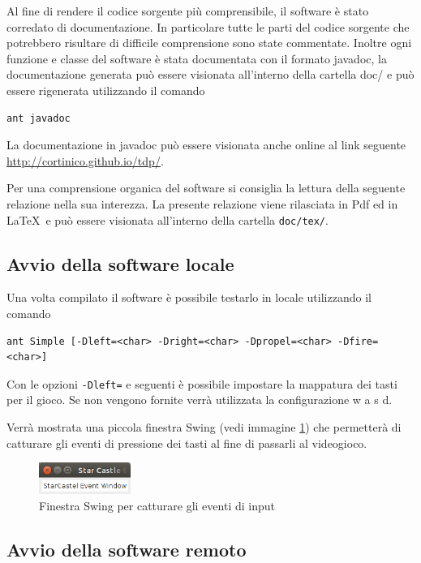 \documentclass[a4paper,12pt]{article}
\begin{document}
Al fine di rendere il codice sorgente pi\`u comprensibile, il software \`e stato corredato di documentazione. In particolare tutte le parti del codice sorgente che potrebbero risultare di difficile comprensione sono state commentate. Inoltre ogni funzione e classe del software \`e stata documentata con il formato \textsf {javadoc}, la documentazione generata pu\`o essere visionata all'interno della cartella \textsf{doc/} e pu\`o essere rigenerata utilizzando il comando
\begin{lstlisting}[basicstyle=\ttfamily]
ant javadoc
\end{lstlisting}

La documentazione in javadoc pu\`o essere visionata anche online al link seguente \url{http://cortinico.github.io/tdp/}.

Per una comprensione organica del software si consiglia la lettura della seguente relazione nella sua interezza. La presente relazione viene rilasciata in Pdf ed in \LaTeX\ e pu\`o essere visionata all'interno della cartella \texttt{doc/tex/}.

\subsection{Avvio della software locale}

Una volta compilato il software \`e possibile testarlo in locale utilizzando il comando
\begin{lstlisting}[basicstyle=\ttfamily]
ant Simple [-Dleft=<char> -Dright=<char> -Dpropel=<char> -Dfire=<char>]
\end{lstlisting}

Con le opzioni \texttt{-Dleft=} e seguenti \`e possibile impostare la mappatura dei tasti per il gioco. Se non vengono fornite verr\`a utilizzata la configurazione \textsf{w a s d}.

Verr\`a mostrata una piccola finestra Swing (vedi immagine \ref{img:Swing}) che permetter\`a di catturare gli eventi di pressione dei tasti al fine di passarli al videogioco.

\begin{figure}[h]
\centering
\includegraphics[width=3cm]{swing.png}
\caption{Finestra Swing per catturare gli eventi di input}
\label{img:Swing}
\end{figure}

\subsection{Avvio della software remoto}
\end{document}
